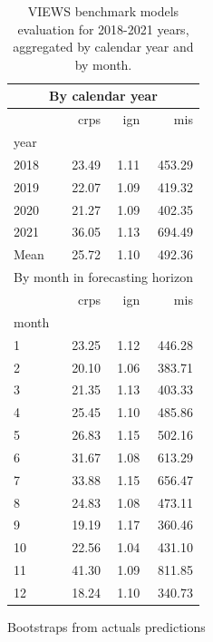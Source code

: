 \documentclass[runningheads]{llncs}
\begin{document}
\begin{table}[ht]
\begin{subtable}[t]{.45\textwidth}
            \begin{tabular}{l@{\hskip 0.5cm}r@{\hskip 0.5cm}r@{\hskip 0.5cm}r}
                \toprule
                \multicolumn{4}{c}{By calendar year} \\
                \midrule
                & crps  & ign  & mis    \\
                year  &       &      &        \\
                \midrule
                2018  & 23.49 & 1.11 & 453.29 \\
                2019  & 22.07 & 1.09 & 419.32 \\
                2020  & 21.27 & 1.09 & 402.35 \\
                2021  & 36.05 & 1.13 & 694.49 \\
                Mean  & 25.72 & 1.10 & 492.36 \\
                \midrule
                \multicolumn{4}{c}{By month in forecasting horizon} \\
                \midrule
                & crps  & ign  & mis    \\
                month &       &      &        \\
                \midrule
                1     & 23.25 & 1.12 & 446.28 \\
                2     & 20.10 & 1.06 & 383.71 \\
                3     & 21.35 & 1.13 & 403.33 \\
                4     & 25.45 & 1.10 & 485.86 \\
                5     & 26.83 & 1.15 & 502.16 \\
                6     & 31.67 & 1.08 & 613.29 \\
                7     & 33.88 & 1.15 & 656.47 \\
                8     & 24.83 & 1.08 & 473.11 \\
                9     & 19.19 & 1.17 & 360.46 \\
                10    & 22.56 & 1.04 & 431.10 \\
                11    & 41.30 & 1.09 & 811.85 \\
                12    & 18.24 & 1.10 & 340.73 \\
                \bottomrule
            \end{tabular}
            \caption{Bootstraps from actuals predictions}
            \label{tab:perf_poisson_benchmark}
        \end{subtable}
        \caption{VIEWS benchmark models evaluation for 2018-2021 years, aggregated by calendar year and by month.}
        \label{tab:benchmarks_eval}
    \end{table}
\end{document}
